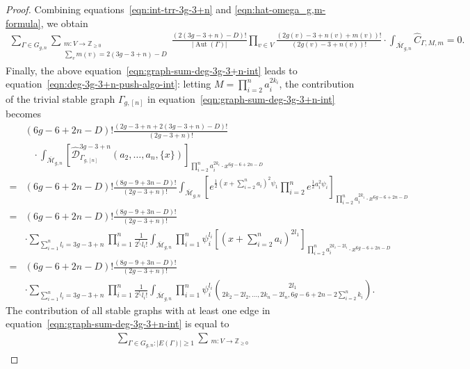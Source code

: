 \documentclass[10pt,a4paper]{amsart}
\DeclareMathOperator{\Aut}{Aut}
\begin{document}
\begin{proof}
Combining equations~\eqref{eqn:int-trr-3g-3+n} and \eqref{eqn:hat-omega_g,m-formula}, we obtain
\begin{align}\label{eqn:graph-sum-deg-3g-3+n-int}
\sum_{\Gamma\in G_{g,n}} \sum_{\substack{m\colon V \to \mathbb Z_{\ge 0} \\ \sum_v m(v) = 2(3g-3+n)-D}}
    \frac{(2(3g-3+n)-D)!}{|\Aut(\Gamma)|}
    \prod_{v \in V} \frac{(2g(v) - 3 + n(v) + m(v))!}{(2g(v) - 3 + n(v))!} \cdot \int_{\overline{\mathcal{M}}_{g,n}}\widehat{C}_{\Gamma, M, m}=0.
  \end{align}
  Finally, the above equation~\eqref{eqn:graph-sum-deg-3g-3+n-int} leads to equation~\eqref{eqn:deg-3g-3+n-push-algo-int}: letting $M=\prod_{i=2}^{n}a_i^{2k_i}$,
  the contribution of the trivial stable graph $\Gamma_{g,[n]}$ in equation~\eqref{eqn:graph-sum-deg-3g-3+n-int} becomes
  \begin{align}\label{eqn:contr-trivial-inter-number}
  &(6g-6+2n-D)!\frac{(2g-3+n+2(3g-3+n)-D)!}{(2g-3+n)!} 
\nonumber\\&\hspace{10pt}\cdot\int_{\overline{\mathcal{M}}_{g,n}}\left[\widehat{\mathcal{D}}_{\Gamma_{g,[n]}}^{3g-3+n}(a_2,\dots,a_n,\{x\})\right]_{\prod_{i=2}^{n}a_i^{2k_i}\cdot x^{6g-6+2n-D}}
\nonumber\\=&(6g-6+2n-D)!\frac{(8g-9+3n-D)!}{(2g-3+n)!} 
\int_{\overline{\mathcal{M}}_{g,n}}\left[e^{\frac{1}{2}(x+\sum_{i=2}^{n}a_i)^2\psi_1}\prod_{i=2}^{n}e^{\frac{1}{2}a_i^2\psi_i}\right]_{\prod_{i=2}^{n}a_i^{2k_i}\cdot x^{6g-6+2n-D}}
\nonumber\\=&(6g-6+2n-D)!\frac{(8g-9+3n-D)!}{(2g-3+n)!} 
\nonumber\\&\cdot
\sum_{\sum_{i=1}^{n}l_i=3g-3+n}\prod_{i=1}^{n}\frac{1}{2^{l_i}l_i!}
\int_{\overline{\mathcal{M}}_{g,n}}\prod_{i=1}^{n}\psi_i^{l_i}\left[(x+\sum_{i=2}^{n}a_i)^{2l_1}\right]_{\prod_{i=2}^{n}a_i^{2k_i-2l_i}\cdot x^{6g-6+2n-D}}
\nonumber\\=&(6g-6+2n-D)!\frac{(8g-9+3n-D)!}{(2g-3+n)!} 
\nonumber\\&\cdot
\sum_{\sum_{i=1}^{n}l_i=3g-3+n}\prod_{i=1}^{n}\frac{1}{2^{l_i}l_i!}
\int_{\overline{\mathcal{M}}_{g,n}}\prod_{i=1}^{n}\psi_i^{l_i}
\binom{2l_1}{2k_2-2l_2,\dots,2k_n-2l_n,6g-6+2n-2\sum_{i=2}^{n}k_i}.
  \end{align}
The contribution of all stable graphs with at least one edge in equation~\eqref{eqn:graph-sum-deg-3g-3+n-int} is equal to 
\begin{align}\label{eqn:contr-other-graph-inter-number}
&\sum_{\Gamma\in G_{g,n}: |E(\Gamma)|\geq1}\sum_{\substack{m:V\rightarrow\mathbb{Z}_{\geq0}\\
}}
\end{align}
\end{proof}
\end{document}
